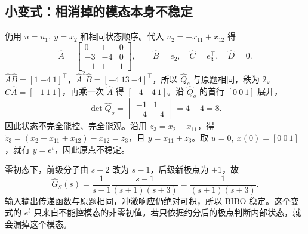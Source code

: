 \subsection{小变式：相消掉的模态本身不稳定}


\sol
仍用 $u=u_1,\ y=x_2$ 和相同状态顺序。代入 $u_2=-x_{11}+x_{12}$ 得
\[
   \widehat A=\begin{bmatrix}0&1&0\\-3&-4&0\\-1&1&1\end{bmatrix},
   \qquad \widehat B=e_2,\quad \widehat C=e_3^\top,\quad \widehat D=0.
\]
$\widehat A\widehat B=[1\ {-4}\ 1]^\top$，$\widehat A^2\widehat B=[-4\ 13\ {-4}]^\top$，所以 $\widehat Q_c$ 与原题相同，秩为 $2$。$\widehat C\widehat A=[-1\ 1\ 1]$，再乘一次 $\widehat A$ 得 $[-4\ {-4}\ 1]$。沿 $\widehat Q_o$ 的首行 $[0\ 0\ 1]$ 展开，
\[
    \det\widehat Q_o=\begin{vmatrix}-1&1\\-4&-4\end{vmatrix}=4+4=8 .
\]
因此状态不完全能控、完全能观。沿用 $z_3=x_2-x_{11}$，得 $\dot z_3=(x_2-x_{11}+x_{12})-x_{12}=z_3$，且 $y=x_{11}+z_3$。取 $u=0,\ x(0)=[0\ 0\ 1]^\top$，就有 $y=e^t$，因此原点不稳定。

零初态下，前级分子由 $s+2$ 改为 $s-1$，后级新极点为 $+1$，故
\[
   \widehat G_S(s)
     =\frac{1}{s-1}\frac{s-1}{(s+1)(s+3)}
     =\frac{1}{(s+1)(s+3)} .
\]
输入输出传递函数与原题相同，冲激响应仍绝对可积，所以 BIBO 稳定。这个变式的 $e^t$ 只来自不能控模态的非零初值。若只依据约分后的极点判断内部状态，就会漏掉这个模态。
